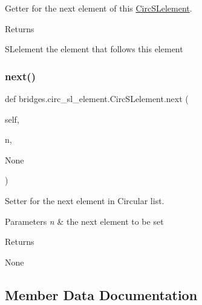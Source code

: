 Getter for the next element of this \mbox{\hyperlink{classbridges_1_1circ__sl__element_1_1_circ_s_lelement}{Circ\+S\+Lelement}}. 

\begin{DoxyReturn}{Returns}


S\+Lelement the element that follows this element 
\end{DoxyReturn}
\mbox{\label{classbridges_1_1circ__sl__element_1_1_circ_s_lelement_a0215303874e167e22f92e4adbdee1e84}} 
\subsubsection{\texorpdfstring{next()}{next()}\hspace{0.1cm}{\footnotesize\ttfamily [2/2]}}
{\footnotesize\ttfamily def bridges.\+circ\+\_\+sl\+\_\+element.\+Circ\+S\+Lelement.\+next (\begin{DoxyParamCaption}\item[{}]{self,  }\item[{}]{n,  }\item[{}]{None }\end{DoxyParamCaption})}



Setter for the next element in Circular list. 


\begin{DoxyParams}{Parameters}
{\em n} & the next element to be set \\
\hline
\end{DoxyParams}
\begin{DoxyReturn}{Returns}

\end{DoxyReturn}
\begin{DoxyParagraph}{None}

\end{DoxyParagraph}


\subsection{Member Data Documentation}
\mbox{\label{classbridges_1_1circ__sl__element_1_1_circ_s_lelement_afc8fa34bcbc539e7966db5ec471e3959}} 
